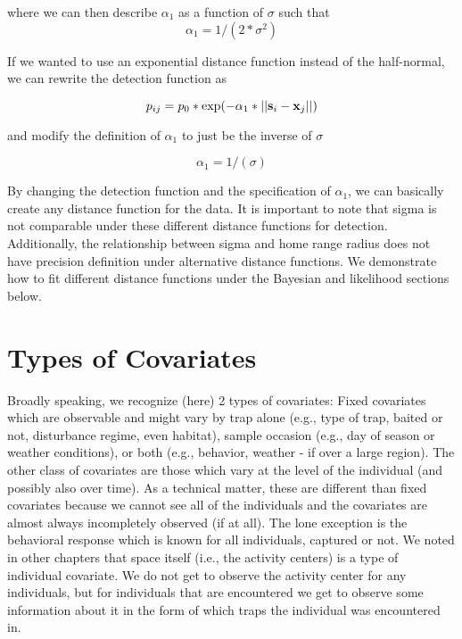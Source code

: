 where we can then describe $\alpha_1$ as a function of $\sigma$ such that
\[
\alpha_{1} = 1/(2*\sigma^2)
\]

If we wanted to use an exponential distance function instead of the half-normal, we can rewrite the detection function as

\[
p_{ij} = p_{0}*\exp(-\alpha_{1} *||{\bf s}_{i}-{\bf x}_{j}||)
\]

and modify the definition of $\alpha_1$ to just be the inverse of $\sigma$

\[
\alpha_{1} = 1/(\sigma)
\]

By changing the detection function and the specification of
$\alpha_1$, we can basically create any distance function for the
data.  It is important to note that sigma is not comparable under
these different distance functions for detection.  Additionally, the
relationship between sigma and home range radius does not have
precision definition under alternative distance functions.  We
demonstrate how to fit different distance functions under the Bayesian
and likelihood sections below.


\section{Types of Covariates}


Broadly speaking, we recognize (here) 2 types of covariates: Fixed
covariates which are observable and might vary by trap alone (e.g.,
type of trap, baited or not, disturbance regime, even habitat), sample
occasion (e.g., day of season or weather conditions), or both (e.g.,
behavior, weather - if over a large region).  The other class of
covariates are those which vary at the level of the individual (and
possibly also over time).  As a technical matter, these are different
than fixed covariates because we cannot see all of the individuals and
the covariates are almost always incompletely observed (if at all).
The lone exception is the behavioral response which is known for all
individuals, captured or not.  We noted in other chapters that space
itself (i.e., the activity centers) is a type of individual
covariate. We do not get to observe the activity center for any
individuals, but for individuals that are encountered we get to
observe some information about it in the form of which traps the
individual was encountered in.


